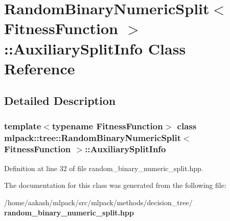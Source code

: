 \section{Random\+Binary\+Numeric\+Split$<$ Fitness\+Function $>$\+:\+:Auxiliary\+Split\+Info Class Reference}
\label{classmlpack_1_1tree_1_1RandomBinaryNumericSplit_1_1AuxiliarySplitInfo}


\subsection{Detailed Description}
\subsubsection*{template$<$typename Fitness\+Function$>$\newline
class mlpack\+::tree\+::\+Random\+Binary\+Numeric\+Split$<$ Fitness\+Function $>$\+::\+Auxiliary\+Split\+Info}



Definition at line 32 of file random\+\_\+binary\+\_\+numeric\+\_\+split.\+hpp.



The documentation for this class was generated from the following file\+:\begin{DoxyCompactItemize}
\item 
/home/aakash/mlpack/src/mlpack/methods/decision\+\_\+tree/\textbf{ random\+\_\+binary\+\_\+numeric\+\_\+split.\+hpp}\end{DoxyCompactItemize}
